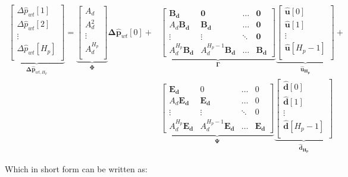 \begin{align}
\underbrace{\begin{bmatrix}
\Delta \hat p_{wt}[1] \\ 
\Delta \hat p_{wt}[2]\\ 
\vdots \\ 
\Delta \hat p_{wt}[H_p]\\ 
\end{bmatrix}}_{\bm{\Delta \hat{p}}_{wt,H_p}}
=
\underbrace{\begin{bmatrix}
A_d \\ 
A_d^2\\ 
\vdots \\ 
A_d^{H_p}\\ 
\end{bmatrix}}_{\bm{\Phi}}
\bm{\Delta \hat{p}}_{wt}[0]+\nonumber
&
\underbrace{\begin{bmatrix}
 \bm{B_d}& \bm{0} & \hdots  & \bm{0}\\ 
 A_d\bm{B_d}&  \bm{B_d}& \hdots & \bm{0}\\ 
\vdots &\vdots  & \ddots  & \bm{0}\\ 
 A_d^{H_p}\bm{B_d}& A_d^{H_p-1}\bm{B_d}  & \hdots  & \bm{B_d}
\end{bmatrix}}_{\bm{\Gamma}}
\underbrace{\begin{bmatrix}
 \bm{\hat{u}}[0] \\ 
 \bm{\hat{u}}[1]\\ 
\vdots \\ 
 \bm{\hat{u}}[H_p-1]\\ 
\end{bmatrix}}_{\bm{\hat{u}_{H_p}}}
+ \\
&
\underbrace{\begin{bmatrix}
 \bm{E_d}& 0 & \hdots  & 0\\ 
 A_d\bm{E_d}&  \bm{E_d}& \hdots & 0\\ 
\vdots &\vdots  & \ddots  & 0\\ 
 A_d^{H_p}\bm{E_d}& A_d^{H_p-1}\bm{E_d}  & \hdots  & \bm{E_d}
\end{bmatrix}}_{\bm{\Psi}}
\underbrace{\begin{bmatrix}
 \bm{\hat{d}}[0] \\ 
 \bm{\hat{d}}[1]\\ 
\vdots \\ 
 \bm{\hat{d}}[H_p-1]\\ 
\end{bmatrix}}_{\bm{\hat{d}_{H_p}}} 
\end{align}

Which in short form can be written as: 

